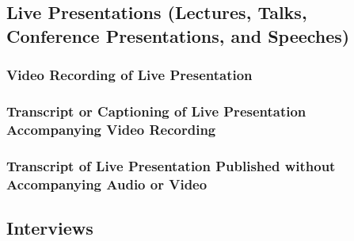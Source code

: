 \documentclass{ltxdockit}
\begin{document}
\subsection{Live Presentations (Lectures, Talks, Conference Presentations, and Speeches)} %
\label{sec:live_presentations_lectures_talks_conference_presentations_and_speeches}
\begin{refsection}
	\printbibliography[heading=none]
\end{refsection}
\subsubsection{Video Recording of Live Presentation} %
\label{sub:video_recording_of_live_presentation}
\begin{refsection}
	\printbibliography[heading=none]
\end{refsection}
\subsubsection{Transcript or Captioning of Live Presentation Accompanying Video Recording} %
\label{sub:transcript_or_captioning_of_live_presentation_accompanying_video_recording}
\citereset
\begin{refsection}
	\printbibliography[heading=none]
\end{refsection}
\subsubsection{Transcript of Live Presentation Published without Accompanying Audio or Video} %
\label{sub:transcript_of_live_presentation_published_without_accompanying_audio_or_video}
\begin{refsection}
	\printbibliography[heading=none]
\end{refsection}

\subsection{Interviews} %
\label{sec:interviews}
\end{document}
